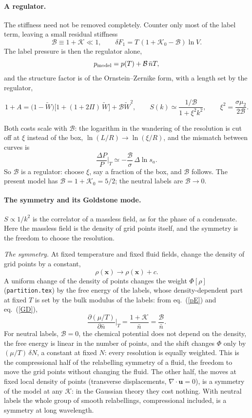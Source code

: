 \documentclass[11pt,aps,preprint,nofootinbib,superscriptaddress,tightenlines]{revtex4-2}
\def\st{\begin{equation}}
\def\stp{\end{equation}}
\def\Eq#1{eq.~(\ref{#1})}
\let\oldparagraph\paragraph
\renewcommand{\paragraph}{\par\bigskip\oldparagraph}
\begin{document}
\paragraph{A regulator.}  The stiffness need not be removed completely.  Counter only most of the label term, leaving a small residual stiffness
\st
\mathcal B\equiv1+\mathcal K\ll1,\qquad \delta F_1=T\,(1+\mathcal K_0-\mathcal B)\ln V .
\stp
The label pressure is then the regulator alone,
\st
p_{\rm model}=p(T)+\mathcal B\,\bar nT ,
\stp
and the structure factor is of the Ornstein--Zernike form, with a length set by the regulator,
\begin{keyeq}
\st
1+A=\big(1-\widetilde W\big)\big[1+(1+2\Pi)\,\widetilde W\big]+\mathcal B\widetilde W^2,\qquad
S(k)\simeq\frac{1/\mathcal B}{1+\xi^2k^2},\qquad \xi^2=\frac{\sigma\mu_2}{2\mathcal B} .
\label{regulator}
\stp
\end{keyeq}
Both costs scale with $\mathcal B$: the logarithm in the wandering of the resolution is cut off at $\xi$ instead of the box, $\ln(L/R)\to\ln(\xi/R)$,
and the mismatch between curves is
\st
\frac{\Delta P}{P}\Big|_T\simeq-\frac{\mathcal B}\sigma\,\Delta\ln s_a .
\stp
So $\mathcal B$ is a regulator: choose $\xi$, say a fraction of the box, and $\mathcal B$ follows.  The present model has
$\mathcal B=1+\mathcal K_0=5/2$; the neutral labels are $\mathcal B\to0$.

\paragraph{The symmetry and its Goldstone mode.}  $S\propto1/k^2$ is the correlator of a massless field, as for the phase of a condensate.  Here the
massless field is the density of grid points itself, and the symmetry is the freedom to choose the resolution.

\emph{The symmetry.}  At fixed temperature and fixed fluid fields, change the density of grid points by a constant,
\st
\rho(\bm x)\to\rho(\bm x)+c .
\stp
A uniform change of the density of points changes the weight $\Phi[\rho]$ (\texttt{partition.tex}) by the free energy of the labels, whose density-dependent
part at fixed $T$ is set by the bulk modulus of the labels: from \Eq{pE} and \Eq{GD},
\st
\frac{\partial(\mu/T)}{\partial\bar n}\Big|_T=\frac{1+\mathcal K}{\bar n}=\frac{\mathcal B}{\bar n} .
\stp
For neutral labels, $\mathcal B=0$, the chemical potential does not depend on the density, the free energy is linear in the number of points, and the
shift changes $\Phi$ only by $(\mu/T)\,\delta N$, a constant at fixed $N$: every resolution is equally weighted.  This is the compressional half of the
relabelling symmetry of a fluid, the freedom to move the grid points without changing the fluid.  The other half, the moves at fixed local density of points
(transverse displacements, $\nabla\!\cdot\bm u=0$), is a symmetry of the model at any $\mathcal K$: in the Gaussian theory they cost nothing.  With neutral
labels the whole group of smooth relabellings, compressional included, is a symmetry at long wavelength.
\end{document}
